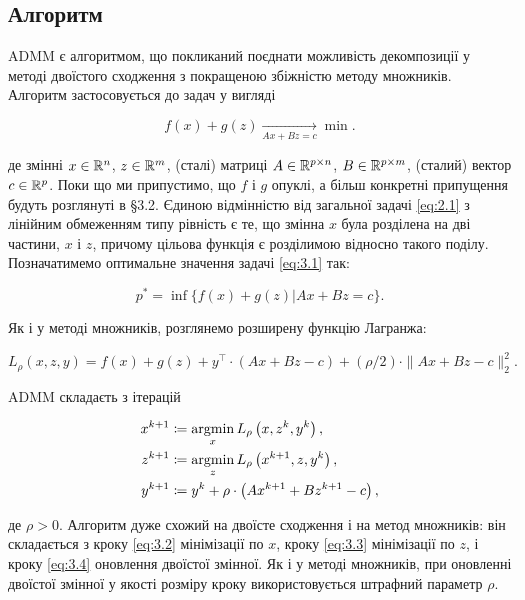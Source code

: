\subsection{Алгоритм}

ADMM є алгоритмом, що покликаний поєднати можливість декомпозиції у методі двоїстого сходження з покращеною збіжністю методу множників. Алгоритм застосовується до задач у вигляді

\begin{equation}
	\label{eq:3.1}
	f(x) + g(z) \xrightarrow[A x + B z = c]{} \min.
\end{equation}

де змінні $x \in \mathbb{R}^n$, $z \in \mathbb{R}^m$, (сталі) матриці  $A \in \mathbb{R}^{p \times n}$, $B \in \mathbb{R}^{p \times m}$, (сталий) вектор $c \in \mathbb{R}^p$. Поки що ми припустимо, що $f$ і $g$ опуклі, а більш конкретні припущення будуть розглянуті в \S3.2. Єдиною відмінністю від загальної задачі \eqref{eq:2.1} з лінійним обмеженням типу рівність є те, що змінна $x$ була розділена на дві частини, $x$ і $z$, причому цільова функція є розділимою відносно такого поділу. Позначатимемо оптимальне значення задачі \eqref{eq:3.1} так:

\begin{equation}
	p^* = \inf \{ f(x) + g(z) | A x + B z = c \}.
\end{equation}

Як і у методі множників, розглянемо розширену функцію Лагранжа:

\begin{equation}
	L_\rho (x, z, y) = 
	f(x) + g(z) + y^\intercal \cdot (A x + B z - c) + 
	(\rho / 2) \cdot \| A x + B z - c \|_2^2.
\end{equation}


ADMM складаєть з ітерацій

\begin{align}
	\label{eq:3.2}
	x^{k + 1} &\coloneqq \operatorname*{argmin}_x L_\rho \left( x, z^k, y^k \right), \\
	\label{eq:3.3}
	z^{k + 1} &\coloneqq \operatorname*{argmin}_z L_\rho \left( x^{k + 1}, z, y^k \right), \\
	\label{eq:3.4}
	y^{k + 1} &\coloneqq y^k + 
	\rho \cdot \left( A x^{k + 1} + B z^{k + 1} - c \right),
\end{align}

де $\rho > 0$. Алгоритм дуже схожий на двоїсте сходження і на метод множників: він складається з кроку \eqref{eq:3.2} мінімізації по $x$, кроку \eqref{eq:3.3} мінімізації по $z$, і кроку \eqref{eq:3.4} оновлення двоїстої змінної. Як і у методі множників, при оновленні двоїстої змінної у якості розміру кроку використовується штрафний параметр $\rho$. \medskip

